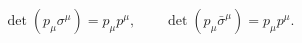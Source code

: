 
\begin{equation}
\boxed{
\det(p_\mu\sigma^\mu)=p_\mu p^\mu,
\qquad
\det(p_\mu\bar\sigma^\mu)=p_\mu p^\mu.}
\label{eq:weyl-determinant-mass-shell-dp21}
\end{equation}


